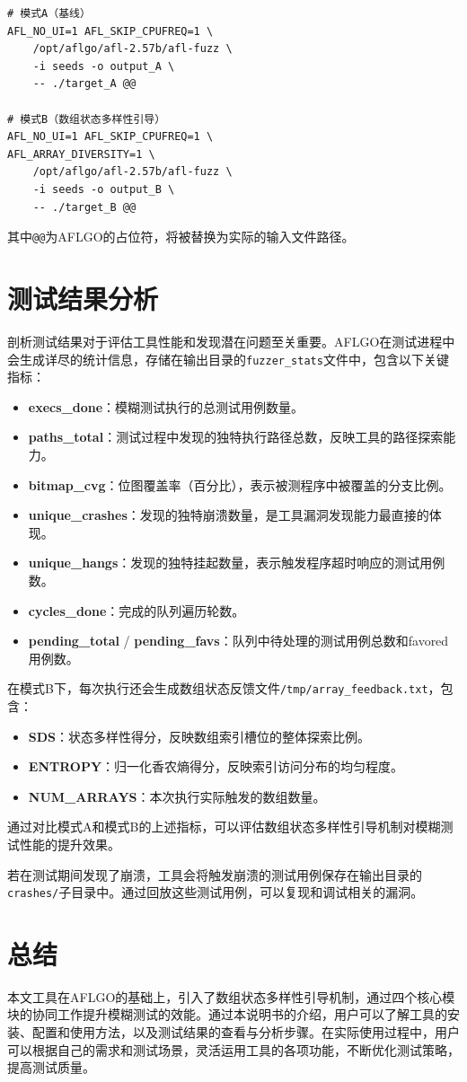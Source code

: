 \documentclass[bachelor]{njupthesis}
\begin{document}
\begin{verbatim}
# 模式A（基线）
AFL_NO_UI=1 AFL_SKIP_CPUFREQ=1 \
    /opt/aflgo/afl-2.57b/afl-fuzz \
    -i seeds -o output_A \
    -- ./target_A @@

# 模式B（数组状态多样性引导）
AFL_NO_UI=1 AFL_SKIP_CPUFREQ=1 \
AFL_ARRAY_DIVERSITY=1 \
    /opt/aflgo/afl-2.57b/afl-fuzz \
    -i seeds -o output_B \
    -- ./target_B @@
\end{verbatim}

其中\texttt{@@}为AFLGO的占位符，将被替换为实际的输入文件路径。

\section{测试结果分析}

剖析测试结果对于评估工具性能和发现潜在问题至关重要。AFLGO在测试进程中会生成详尽的统计信息，存储在输出目录的\texttt{fuzzer\_stats}文件中，包含以下关键指标：

\begin{itemize}
\item \textbf{execs\_done}：模糊测试执行的总测试用例数量。
\item \textbf{paths\_total}：测试过程中发现的独特执行路径总数，反映工具的路径探索能力。
\item \textbf{bitmap\_cvg}：位图覆盖率（百分比），表示被测程序中被覆盖的分支比例。
\item \textbf{unique\_crashes}：发现的独特崩溃数量，是工具漏洞发现能力最直接的体现。
\item \textbf{unique\_hangs}：发现的独特挂起数量，表示触发程序超时响应的测试用例数。
\item \textbf{cycles\_done}：完成的队列遍历轮数。
\item \textbf{pending\_total} / \textbf{pending\_favs}：队列中待处理的测试用例总数和favored用例数。
\end{itemize}

在模式B下，每次执行还会生成数组状态反馈文件\texttt{/tmp/array\_feedback.txt}，包含：

\begin{itemize}
\item \textbf{SDS}：状态多样性得分，反映数组索引槽位的整体探索比例。
\item \textbf{ENTROPY}：归一化香农熵得分，反映索引访问分布的均匀程度。
\item \textbf{NUM\_ARRAYS}：本次执行实际触发的数组数量。
\end{itemize}

通过对比模式A和模式B的上述指标，可以评估数组状态多样性引导机制对模糊测试性能的提升效果。

若在测试期间发现了崩溃，工具会将触发崩溃的测试用例保存在输出目录的\texttt{crashes/}子目录中。通过回放这些测试用例，可以复现和调试相关的漏洞。

\section{总结}

本文工具在AFLGO的基础上，引入了数组状态多样性引导机制，通过四个核心模块的协同工作提升模糊测试的效能。通过本说明书的介绍，用户可以了解工具的安装、配置和使用方法，以及测试结果的查看与分析步骤。在实际使用过程中，用户可以根据自己的需求和测试场景，灵活运用工具的各项功能，不断优化测试策略，提高测试质量。
\end{document}
